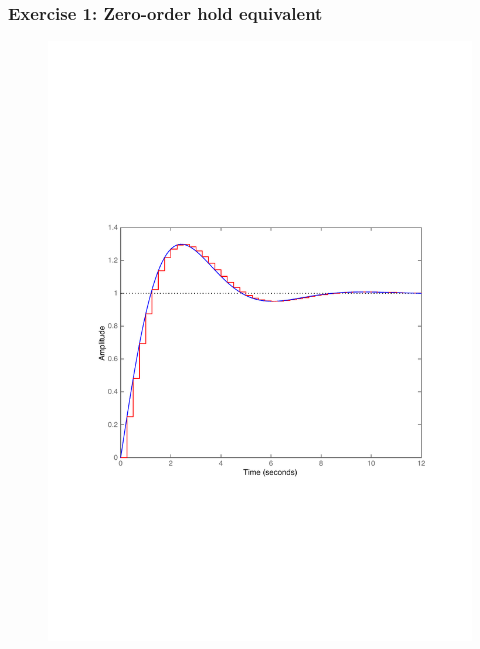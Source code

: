 \begin{frame}
	\frametitle{Exercise 1: Zero-order hold equivalent}
	\vspace{-0.7em}
	\begin{figure}
		\centering
		\includegraphics[width=0.8\linewidth]{vb1}
	\end{figure}
\end{frame}

